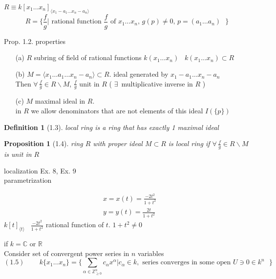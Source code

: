 \documentclass[10pt]{amsart}
\newtheorem{proposition}{Proposition}
\newtheorem{definition}{Definition}
\newcommand{\exercisehead}[1]
  { \smallskip
   \noindent{\small\bf Exercise #1.}
  }
\begin{document}
\begin{multicols*}{2}
$R \equiv k[x_1 \dots x_n]_{\langle x_1 - a_1 \dots x_n-a_n \rangle }$ 
\[
R = \lbrace \frac{f}{g} | \text{ rational function $\frac{f}{g}$ of $x_1 \dots x_n$, $g(p) \neq 0$, $p=(a_1 \dots a_n) $ } \rbrace
\]

Prop. 1.2. properties 

\begin{enumerate}
\item[(a)] $R$ subring of field of rational functions $k(x_1 \dots x_n)$ \quad \, $k(x_1 \dots x_n) \subset R$ 
\item[(b)] $M = \langle x_1 \dots a_1 \dots x_n -a_n \rangle \subset R$.  ideal generated by $x_1 - a_1 \dots x_n-a_n$ \\
Then $\forall \, \frac{f}{g} \in R\backslash M$, $\frac{f}{g}$ unit in $R$ ( $\exists \, $ multiplicative inverse in $R$ )
\item[(c)] $M$ maximal ideal in $R$. \\
in $R$ we allow denominators that are not elements of this ideal $I(\lbrace p \rbrace)$ 
\end{enumerate}

\begin{definition}[1.3] local ring is a ring that has exactly 1 maximal ideal \end{definition}

\begin{proposition}[1.4] ring $R$ with proper ideal $M\subset R$ is local ring if $\forall \, \frac{f}{g} \in R\backslash M$ is unit in $R$
\end{proposition}

localization Ex. 8, Ex. 9 \\
parametrization

\exercisehead{2} \[
\begin{aligned}
  & x = x(t) = \frac{-2t^2 }{1+t^2} \\ 
 &  y = y(t) = \frac{2t}{1+t^2}
\end{aligned}
\]
$k[t]_{\langle t \rangle}$ \quad \, $\frac{-2t^2}{1+t^2}$ rational function of $t$.  $1+t^2 \neq 0$

if $k = \mathbb{C}$ or $\mathbb{R}$ \\

Consider set of convergent power series in $n$ variables \\

\begin{equation}
(1.5) \quad \quad \,   k\lbrace x_1 \dots x_n \rbrace = \lbrace \sum_{\alpha \in \mathbb{Z}^n_{\geq 0}} c_{\alpha} x^{\alpha} | c_{\alpha} \in k, \text{ series converges in some open $U\ni 0 \in k^n $ } \rbrace
\end{equation}


\end{multicols*}
\end{document}
